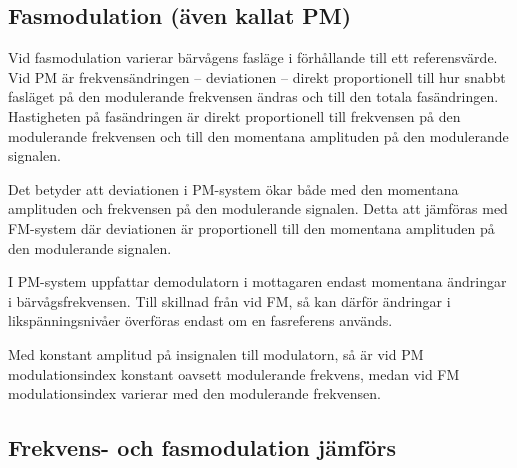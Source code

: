 \subsection{Fasmodulation (även kallat PM)}

Vid fasmodulation varierar bärvågens fasläge i förhållande till ett
referensvärde.
Vid PM är frekvensändringen -- deviationen -- direkt proportionell till hur
snabbt fasläget på den modulerande frekvensen ändras och till den totala
fasändringen.
Hastigheten på fasändringen är direkt proportionell till frekvensen på den
modulerande frekvensen och till den momentana amplituden på den modulerande
signalen.

Det betyder att deviationen i PM-system ökar både med den momentana amplituden
och frekvensen på den modulerande signalen.
Detta att jämföras med FM-system där deviationen är proportionell till den
momentana amplituden på den modulerande signalen.

I PM-system uppfattar demodulatorn i mottagaren endast momentana ändringar i
bärvågsfrekvensen.
Till skillnad från vid FM, så kan därför ändringar i likspänningsnivåer
överföras endast om en fasreferens används.

Med konstant amplitud på insignalen till modulatorn, så är vid PM
modulationsindex konstant oavsett modulerande frekvens, medan vid FM
modulationsindex varierar med den modulerande frekvensen.

\subsection{Frekvens- och fasmodulation jämförs}

